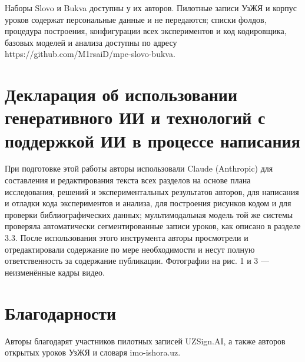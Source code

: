 Наборы Slovo и Bukva доступны у их авторов. Пилотные записи УзЖЯ и корпус уроков содержат персональные данные и не передаются; списки фолдов, процедура построения, конфигурации всех экспериментов и код кодировщика, базовых моделей и анализа доступны по адресу https://github.com/M1rsaiD/mpe-slovo-bukva.

\hypertarget{ux434ux435ux43aux43bux430ux440ux430ux446ux438ux44f-ux43eux431-ux438ux441ux43fux43eux43bux44cux437ux43eux432ux430ux43dux438ux438-ux433ux435ux43dux435ux440ux430ux442ux438ux432ux43dux43eux433ux43e-ux438ux438-ux438-ux442ux435ux445ux43dux43eux43bux43eux433ux438ux439-ux441-ux43fux43eux434ux434ux435ux440ux436ux43aux43eux439-ux438ux438-ux432-ux43fux440ux43eux446ux435ux441ux441ux435-ux43dux430ux43fux438ux441ux430ux43dux438ux44f}{%
\section{Декларация об использовании генеративного ИИ и технологий с поддержкой ИИ в процессе написания}\label{ux434ux435ux43aux43bux430ux440ux430ux446ux438ux44f-ux43eux431-ux438ux441ux43fux43eux43bux44cux437ux43eux432ux430ux43dux438ux438-ux433ux435ux43dux435ux440ux430ux442ux438ux432ux43dux43eux433ux43e-ux438ux438-ux438-ux442ux435ux445ux43dux43eux43bux43eux433ux438ux439-ux441-ux43fux43eux434ux434ux435ux440ux436ux43aux43eux439-ux438ux438-ux432-ux43fux440ux43eux446ux435ux441ux441ux435-ux43dux430ux43fux438ux441ux430ux43dux438ux44f}}

При подготовке этой работы авторы использовали Claude (Anthropic) \citep{2026_anthropic_claude} для составления и редактирования текста всех разделов на основе плана исследования, решений и экспериментальных результатов авторов, для написания и отладки кода экспериментов и анализа, для построения рисунков кодом и для проверки библиографических данных; мультимодальная модель той же системы проверяла автоматически сегментированные записи уроков, как описано в разделе 3.3. После использования этого инструмента авторы просмотрели и отредактировали содержание по мере необходимости и несут полную ответственность за содержание публикации. Фотографии на рис. 1 и 3 --- неизменённые кадры видео.

\hypertarget{ux431ux43bux430ux433ux43eux434ux430ux440ux43dux43eux441ux442ux438}{%
\section{Благодарности}\label{ux431ux43bux430ux433ux43eux434ux430ux440ux43dux43eux441ux442ux438}}

Авторы благодарят участников пилотных записей UZSign.AI, а также авторов открытых уроков УзЖЯ и словаря imo-ishora.uz.
